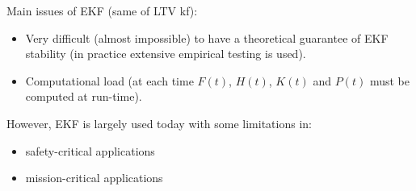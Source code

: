 \begin{rem}
    Main issues of EKF (same of LTV \gls{kf}):
    \begin{itemize}
        \item Very difficult (almost impossible) to have a theoretical guarantee of EKF stability (in practice extensive empirical testing is used).
        \item Computational load (at each time $F(t)$, $H(t)$, $K(t)$ and $P(t)$ must be computed at run-time).
    \end{itemize}

    However, EKF is largely used today with some limitations in:
    \begin{itemize}
        \item safety-critical applications
        \item mission-critical applications
    \end{itemize}
\end{rem}

